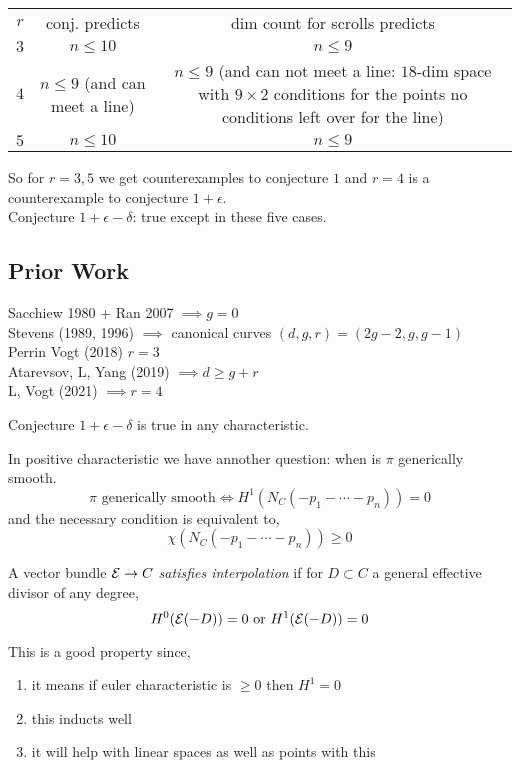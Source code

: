 \documentclass[12pt]{article}
\begin{document}
\begin{center}
\begin{tabular}{c|c|c}
$r$ & conj. predicts & dim count for scrolls predicts
\\
$3$ & $n \le 10$ & $n \le 9$
\\
$4$ & $n \le 9$ (and can meet a line) & $n \le 9$ (and can not meet a line: $18$-dim space with $9 \times 2$ conditions for the points no conditions left over for the line)
\\
$5$ & $n \le 10$ & $n \le 9$
\end{tabular}
\end{center}
So for $r = 3,5$ we get counterexamples to conjecture $1$ and $r = 4$ is a counterexample to conjecture $1+\epsilon$.
\bigskip\\
Conjecture $1 + \epsilon - \delta$: true except in these five cases.

\subsection{Prior Work}

Sacchiew 1980 + Ran 2007 $\implies g = 0$
\\
Stevens (1989, 1996) $\implies$ canonical curves $(d,g,r) = (2g - 2, g, g - 1)$
\\
Perrin Vogt (2018) $r = 3$ 
\\
Atarevsov, L, Yang (2019) $\implies d \ge g + r$
\\
L, Vogt (2021) $\implies r = 4$

\begin{theorem}[V, Vogt]
Conjecture $1 + \epsilon - \delta$ is true in any characteristic. 
\end{theorem}

In positive characteristic we have annother question: when is $\pi$ generically smooth. 
\[ \pi \text{ generically smooth} \iff H^1(N_C(-p_1 - \cdots - p_n)) = 0 \]
and the necessary condition is equivalent to,
\[ \chi(N_C(-p_1 - \cdots - p_n)) \ge 0 \]

\begin{defn}
A vector bundle $\mathcal{E} \to C$ \textit{satisfies interpolation} if for $D \subset C$ a general effective divisor of any degree,
\[ H^0(\mathcal{E}(-D)) = 0 \text{ or } H^1(\mathcal{E}(-D)) = 0 \]
\end{defn}

\begin{rmk}
This is a good property since,
\begin{enumerate}
\item it means if euler characteristic is $\ge 0$ then $H^1 = 0$

\item this inducts well

\item it will help with linear spaces as well as points with this
\end{enumerate}
\end{rmk}
\end{document}

